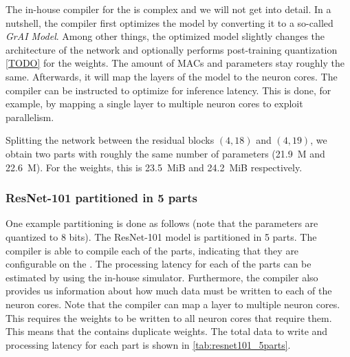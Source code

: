 The in-house compiler for the \graicore{} is complex and we will not get into detail.
In a nutshell, the compiler first optimizes the model by converting it to a so-called \textit{GrAI Model}.
Among other things, the optimized model slightly changes the architecture of the network and optionally performs post-training quantization \cref{TODO} for the weights.
The amount of MACs and parameters stay roughly the same.
Afterwards, it will map the layers of the model to the neuron cores.
The compiler can be instructed to optimize for inference latency.
This is done, for example, by mapping a single layer to multiple neuron cores to exploit parallelism.

Splitting the network between the residual blocks $(4, 18)$ and $(4, 19)$, we obtain two parts with roughly the same number of parameters (\SI{21.9}{M} and \SI{22.6}{M}).
For the weights, this is \SI{23.5}{MiB} and \SI{24.2}{MiB} respectively.

\hrulefill


\subsubsection{ResNet-101 partitioned in 5 parts}
One example partitioning is done as follows (note that the parameters are quantized to 8 bits).
The ResNet-101 model is partitioned in 5 parts.
The compiler is able to compile each of the parts, indicating that they are configurable on the \graicore{}.
The processing latency for each of the parts can be estimated by using the in-house \graipefruit{} simulator.
Furthermore, the compiler also provides us information about how much data must be written to each of the neuron cores.
Note that the compiler can map a layer to multiple neuron cores.
This requires the weights to be written to all neuron cores that require them.
This means that the \graicore{} contains duplicate weights.
The total data to write and processing latency for each part is shown in \cref{tab:resnet101_5parts}.


